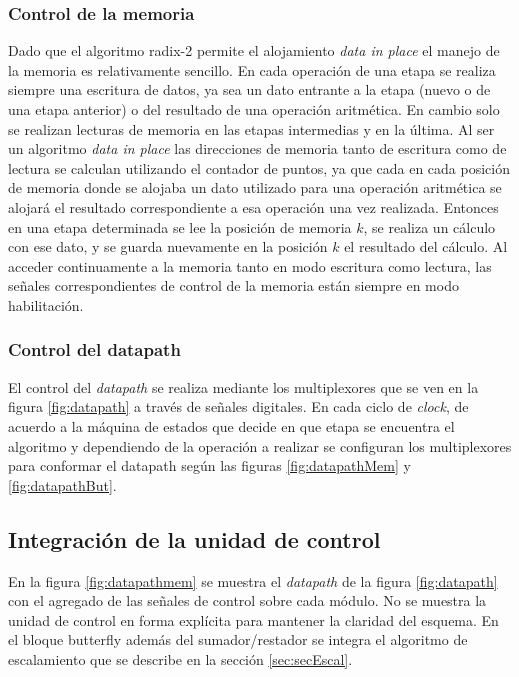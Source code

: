 \subsubsection{Control de la memoria}

Dado que el algoritmo radix-2 permite el alojamiento \textit{data in place} el manejo de la memoria
es relativamente sencillo. 
En cada operación de una etapa se realiza siempre una escritura de datos, ya sea un dato entrante a
la etapa (nuevo o de una etapa anterior) o del resultado de una operación aritmética. En cambio solo
se realizan lecturas de memoria en las etapas intermedias y en la última.
Al ser un algoritmo \textit{data in place} las direcciones de memoria tanto de escritura como de
lectura se calculan utilizando el contador de puntos, ya que cada en cada posición de memoria
donde se alojaba un dato utilizado para una operación aritmética se alojará el resultado
correspondiente a esa operación una vez realizada. Entonces en una etapa determinada se lee la
posición de memoria $k$, se realiza un cálculo con ese dato, y se guarda nuevamente en la posición
$k$ el resultado del cálculo.
Al acceder continuamente a la memoria tanto en modo escritura como lectura, las señales
correspondientes de control de la memoria están siempre en modo habilitación.

\subsubsection{Control del datapath}

El control del \textit{datapath} se realiza mediante los multiplexores que se ven en la figura
\ref{fig:datapath} a través de señales digitales. En cada ciclo de \textit{clock}, de acuerdo a la máquina de
estados que decide en que etapa se encuentra el algoritmo y dependiendo de la operación a realizar
se configuran los multiplexores para conformar el datapath según las figuras \ref{fig:datapathMem}
y \ref{fig:datapathBut}.

\subsection{Integración de la unidad de control}

En la figura \ref{fig:datapathmem} se muestra el \textit{datapath} de la figura \ref{fig:datapath} con el
agregado de las señales de control sobre cada módulo. No se muestra la unidad de control en forma
explícita para mantener la claridad del esquema. En el bloque butterfly además del
sumador/restador se integra el algoritmo de escalamiento que se describe en la sección
\ref{sec:secEscal}.

